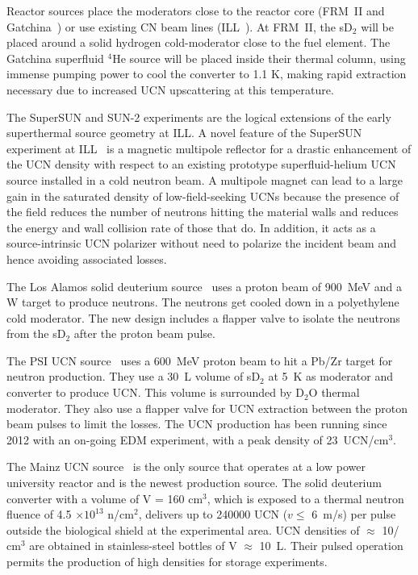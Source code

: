 Reactor sources place the moderators close to the reactor core (FRM~II
and Gatchina~\cite{Serebrov_ascona}) or use existing CN beam lines
(ILL~\cite{Piegsa2014}). At FRM~II, the sD$_2$ will be placed
around a solid hydrogen cold-moderator close to the fuel element. The
Gatchina superfluid $^4$He source will be placed inside their thermal
column, using immense pumping power to cool the converter to 1.1 K,
making rapid extraction necessary due to increased UCN upscattering at
this temperature.

The SuperSUN and SUN-2 experiments are the logical extensions of the
early superthermal source geometry at ILL.  A novel feature of the
SuperSUN experiment at ILL~\cite{Zimmer2015} is a magnetic
multipole reflector for a drastic enhancement of the UCN density with
respect to an existing prototype superfluid-helium UCN source
installed in a cold neutron beam. A multipole magnet can lead to a
large gain in the saturated density of low-field-seeking UCNs because
the presence of the field reduces the number of neutrons hitting the
material walls and reduces the energy and wall collision rate of those
that do. In addition, it acts as a source-intrinsic UCN polarizer
without need to polarize the incident beam and hence avoiding
associated losses.

The Los Alamos solid deuterium source~\cite{Ito_ascona} uses a
proton beam of 900~MeV and a W target to produce neutrons. The
neutrons get cooled down in a polyethylene cold moderator. The new
design includes a flapper valve to isolate the neutrons from the
sD$_2$ after the proton beam pulse.

The PSI UCN source~\cite{Ries_ascona} uses a 600~MeV proton beam
to hit a Pb/Zr target for neutron production. They use a 30~L volume
of sD$_2$ at 5~K as moderator and converter to produce UCN. This
volume is surrounded by D$_2$O thermal moderator. They also use a
flapper valve for UCN extraction between the proton beam pulses to
limit the losses. The UCN production has been running since 2012 with
an on-going EDM experiment, with a peak density of 23~UCN/cm$^3$.

The Mainz UCN source~\cite{Karch2014} is the only source that
operates at a low power university reactor and is the newest
production source. The solid deuterium converter with a volume of V =
160 cm$^3$, which is exposed to a thermal neutron fluence of 4.5
$\times 10^{13}$ n/cm$^2$, delivers up to 240000 UCN ($v \leq$ 6~m/s)
per pulse outside the biological shield at the experimental area.  UCN
densities of $\approx$ 10/ cm$^3$ are obtained in stainless-steel
bottles of V $\approx$ 10~L. Their pulsed operation permits the
production of high densities for storage experiments.

